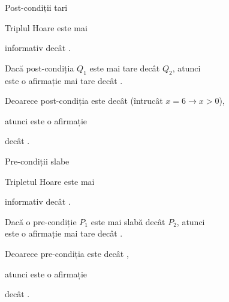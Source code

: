 \begin{frame}{Post-condiții tari}

\begin{example}
Triplul Hoare  este mai

informativ decât .
\end{example}

\medskip \pause
Dacă \alert{post-condiția} $Q_1$ este \alert{mai tare} decât $Q_2$, atunci \\  este o afirmație \alert{mai tare} decât .

\medskip \pause
\begin{example}
Deoarece post-condiția  este  decât  (întrucât $x = 6 \to x > 0$),

atunci  este o afirmație 

decât .
\end{example}
\end{frame}


\begin{frame}{Pre-condiții slabe}

\begin{example}
Tripletul Hoare  este mai

informativ decât .
\end{example}

\medskip
Dacă o \alert{pre-condiție} $P_1$ este \alert{mai slabă} decât $P_2$, atunci \\  este o afirmație \alert{mai tare} decât .

\medskip
\begin{example}
Deoarece pre-condiția  este  decât ,

atunci  este o afirmație 

decât  .
\end{example}
\end{frame}

